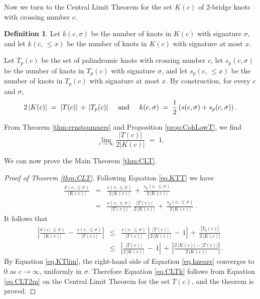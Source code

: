 \documentclass[11pt]{amsart}
\theoremstyle{definition}
\newtheorem{definition}[theorem]{Definition}
\theoremstyle{remark}
\numberwithin{equation}{section}
\begin{document}
    
    
Now we turn to the Central Limit Theorem for  the set $K(c)$ of 2-bridge knots with crossing number $c$.    

\begin{definition}
    Let $k(c,\sigma)$ be the number of knots in $K(c)$ with signature $\sigma$, and let $k(c,\,\leq x)$ be the number of knots in $K(c)$ 
with signature at most $x$.

Let $T_p(c)$ be the set of palindromic knots with crossing number $c$, let $s_p(c,\sigma)$ be the number of knots in $T_p(c)$ with signature $\sigma$, 
and let $s_p(c,\,\leq x)$ be the number of knots in $T_p(c)$ with signature at most $x$.   
  By construction, for every $c$ and $\sigma$,
\begin{equation*}
   \label{eq.KTT}
   2\, |K(c)|  \;=\;  |T(c)| \,+\,  |T_p(c)|    \hspace{5mm}\hbox{and}\hspace{5mm}   k(c,\sigma)  \;=\; \frac{1}{2}\left(s(c,\sigma)+s_p(c,\sigma)\right).
\end{equation*}
\end{definition}

From Theorem \ref{thm:ernstsumners} and Proposition \ref{prop:CohLowT}, we find
\begin{equation}
   \label{eq.KTlim}
   \lim_{c\rightarrow\infty}  \frac{|T(c)|}{2|K(c)|}  \;=\; 1.
\end{equation}


We can now prove the Main Theorem \ref{thm:CLT}.


\begin{proof}[Proof of Theorem \ref{thm:CLT}]
Following Equation \eqref{eq.KTT} we have
\begin{eqnarray*}
     \frac{k(c,\leq\sigma)}{|K(c)|}  & = & \frac{s(c,\leq \sigma)}{2\,|K(c)|}  \,+\, \frac{s_p(c,\leq \sigma)}{2\,|K(c)|} 
     \\
     & = &    \frac{s(c,\leq \sigma)}{|T(c)|} \,\frac{|T(c)|}{2\,|K(c)|}  \,+\, \frac{s_p(c,\leq \sigma)}{2\,|K(c)|}  \,.
\end{eqnarray*}
It follows that 
\begin{eqnarray}
   \nonumber
   \left|   \frac{k(c,\leq\sigma)}{|K(c)|}  \,-\,   \frac{s(c,\leq \sigma)}{|T(c)|} \right|   & \leq &        \frac{s(c,\leq \sigma)}{|T(c)|} \,
    \left|  \frac{|T(c)|}{2\,|K(c)|}   \,-\,1 \right|   \,+\,   \frac{|T_p(c)|}{2\,|K(c)|}
    \\
    \label{eq.knears}
       & \leq &       \left|  \frac{|T(c)|}{2\,|K(c)|}   \,-\,1 \right|   \,+\,   \left| \frac{2\,|K(c)|-|T(c)|}{2\,|K(c)|} \right|\,.
 \end{eqnarray}
By Equation \eqref{eq.KTlim}, the right-hand side of Equation \eqref{eq.knears} converges to 0 as $c\rightarrow\infty$, uniformly in $\sigma$.   
Therefore Equation \eqref{eq.CLTk} follows from 
Equation \eqref{eq.CLT2m} on the Central Limit Theorem for the set $T(c)$, and the theorem is proved.
\end{proof}
    
\end{document}
